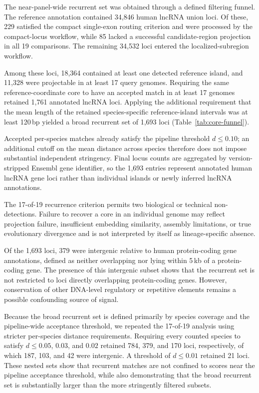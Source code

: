 The near-panel-wide recurrent set was obtained through a defined filtering
funnel. The reference annotation contained 34{,}846 human lncRNA union loci.
Of these, 229 satisfied the compact single-exon routing criterion and were
processed by the compact-locus workflow, while 85 lacked a successful
candidate-region projection in all 19 comparisons. The remaining 34{,}532 loci
entered the localized-subregion workflow.

Among these loci, 18{,}364 contained at least one detected reference island, and
11{,}328 were projectable in at least 17 query genomes. Requiring the same
reference-coordinate core to have an accepted match in at least 17 genomes
retained 1{,}761 annotated lncRNA loci. Applying the additional requirement that
the mean length of the retained species-specific reference-island intervals was
at least 120\,bp yielded a broad recurrent set of 1{,}693 loci
(Table~\ref{tab:core-funnel}).

Accepted per-species matches already satisfy the pipeline threshold
$d \leq 0.10$; an additional cutoff on the mean distance across species therefore
does not impose substantial independent stringency. Final locus counts are
aggregated by version-stripped Ensembl gene identifier, so the 1{,}693 entries
represent annotated human lncRNA gene loci rather than individual islands or
newly inferred lncRNA annotations.

The 17-of-19 recurrence criterion permits two biological or technical
non-detections. Failure to recover a core in an individual genome may reflect
projection failure, insufficient embedding similarity, assembly limitations, or
true evolutionary divergence and is not interpreted by itself as lineage-specific
absence.

Of the 1{,}693 loci, 379 were intergenic relative to human protein-coding gene
annotations, defined as neither overlapping nor lying within 5\,kb of a
protein-coding gene. The presence of this intergenic subset shows that the
recurrent set is not restricted to loci directly overlapping protein-coding
genes. However, conservation of other DNA-level regulatory or repetitive
elements remains a possible confounding source of signal.

Because the broad recurrent set is defined primarily by species coverage and the
pipeline-wide acceptance threshold, we repeated the 17-of-19 analysis using
stricter per-species distance requirements. Requiring every counted species to
satisfy $d \leq 0.05$, $0.03$, and $0.02$ retained 784, 379, and 170 loci,
respectively, of which 187, 103, and 42 were intergenic. A threshold of
$d \leq 0.01$ retained 21 loci. These nested sets show that recurrent matches are
not confined to scores near the pipeline acceptance threshold, while also
demonstrating that the broad recurrent set is substantially larger than the
more stringently filtered subsets.


